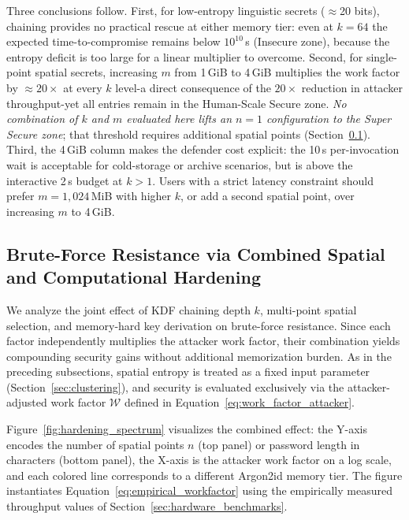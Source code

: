 \documentclass[journal,article,submit,pdftex,moreauthors]{Definitions/mdpi}
\newcommand{\add}[1]{#1}
\newcommand{\remove}[1]{}
\newcommand{\add}[1]{\added{#1}}
\newcommand{\remove}[1]{\deleted{#1}}
\begin{document}
\add{Three conclusions follow. First, for low-entropy linguistic secrets ($\approx$20 bits), chaining provides no practical rescue at either memory tier: even at $k=64$ the expected time-to-compromise remains below $10^{10}$\,s (Insecure zone), because the entropy deficit is too large for a linear multiplier to overcome. Second, for single-point spatial secrets, increasing $m$ from 1\,GiB to 4\,GiB multiplies the work factor by $\approx\!20\times$ at every $k$ level-a direct consequence of the $20\times$ reduction in attacker throughput-yet all entries remain in the Human-Scale Secure zone. \emph{No combination of $k$ and $m$ evaluated here lifts an $n=1$ configuration to the Super Secure zone}; that threshold requires additional spatial points (Section~\ref{sec:defense_in_depth}). Third, the 4\,GiB column makes the defender cost explicit: the 10\,s per-invocation wait is acceptable for cold-storage or archive scenarios, but is above the interactive 2\,s budget at $k>1$. Users with a strict latency constraint should prefer $m=1{,}024$\,MiB with higher $k$, or add a second spatial point, over increasing $m$ to 4\,GiB.}


\subsection{Brute-Force Resistance via Combined Spatial and Computational Hardening}
\label{sec:defense_in_depth}

\remove{We analyze the combined effect of spatial multi-point selection and memory-hard key derivation on brute-force resistance.}\add{We analyze the joint effect of KDF chaining depth $k$, multi-point spatial selection, and memory-hard key derivation on brute-force resistance. Since each factor independently multiplies the attacker work factor, their combination yields compounding security gains without additional memorization burden.} As in the preceding subsections, spatial entropy is treated as a fixed input parameter (Section~\ref{sec:clustering}), and security is evaluated exclusively via the attacker-adjusted work factor $\mathcal{W}$ defined in Equation~\ref{eq:work_factor_attacker}.

Figure~\ref{fig:hardening_spectrum} visualizes the combined effect: the Y-axis encodes the number of spatial points $n$ (top panel) or password length in characters (bottom panel), the X-axis is the attacker work factor on a log scale, and each colored line corresponds to a different Argon2id memory tier. The figure instantiates Equation~\ref{eq:empirical_workfactor} using the empirically measured throughput values of Section~\ref{sec:hardware_benchmarks}.
\end{document}
